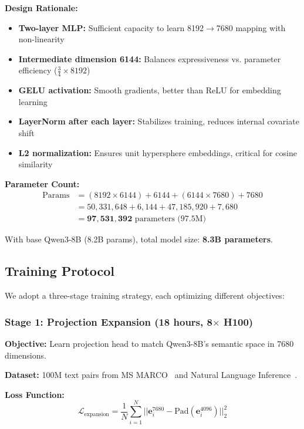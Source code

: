 \documentclass[11pt,a4paper]{article}
\begin{document}
\textbf{Design Rationale:}
\begin{itemize}
\item \textbf{Two-layer MLP:} Sufficient capacity to learn 8192$\to$7680 mapping with non-linearity
\item \textbf{Intermediate dimension 6144:} Balances expressiveness vs. parameter efficiency ($\frac{3}{4} \times 8192$)
\item \textbf{GELU activation:} Smooth gradients, better than ReLU for embedding learning
\item \textbf{LayerNorm after each layer:} Stabilizes training, reduces internal covariate shift
\item \textbf{L2 normalization:} Ensures unit hypersphere embeddings, critical for cosine similarity
\end{itemize}

\textbf{Parameter Count:}
\begin{align}
\text{Params} &= (8192 \times 6144) + 6144 + (6144 \times 7680) + 7680 \\
&= 50,331,648 + 6,144 + 47,185,920 + 7,680 \\
&= \mathbf{97,531,392} \text{ parameters (97.5M)}
\end{align}

With base Qwen3-8B (8.2B params), total model size: \textbf{8.3B parameters}.

\subsection{Training Protocol}

We adopt a three-stage training strategy, each optimizing different objectives:

\subsubsection{Stage 1: Projection Expansion (18 hours, 8$\times$ H100)}

\textbf{Objective:} Learn projection head to match Qwen3-8B's semantic space in 7680 dimensions.

\textbf{Dataset:} 100M text pairs from MS MARCO~\cite{nguyen2016msmarco} and Natural Language Inference~\cite{bowman2015snli}.

\textbf{Loss Function:}
\begin{equation}
\mathcal{L}_{\text{expansion}} = \frac{1}{N} \sum_{i=1}^{N} ||\mathbf{e}_i^{7680} - \text{Pad}(\mathbf{e}_i^{4096})||_2^2
\end{equation}
\end{document}
